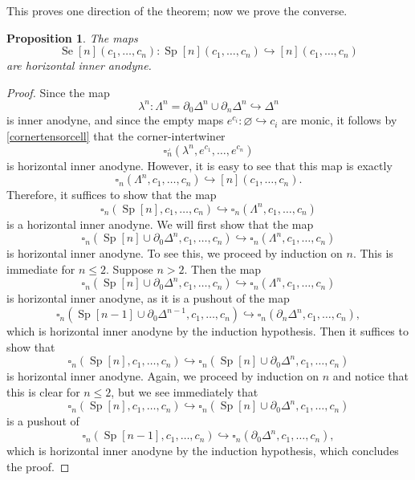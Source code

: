 \documentclass[leqno]{article}
\numberwithin{equation}{subsection}
\theoremstyle{plain}   %
\newtheorem{prop}[equation]{Proposition}
\theoremstyle{remark}
\theoremstyle{plain}
\begin{document}
This proves one direction of the theorem; now we prove the converse.
\begin{prop} The maps \[\operatorname{Se}[n](c_1,\dots,c_n):\operatorname{Sp}[n](c_1,\dots,c_n) \hookrightarrow [n](c_1,\dots,c_n)\] are horizontal inner anodyne.
\end{prop}
\begin{proof} 
	Since the map 
	\[\lambda^n: \Lambda^n=\partial_0 \Delta^n \cup \partial_n\Delta^n \hookrightarrow \Delta^n\]
	is inner anodyne, and since the empty maps \(e^{c_i}:\varnothing \hookrightarrow c_i\) are monic, it follows by \ref{cornertensorcell} that the corner-intertwiner 
	\[\square^\lrcorner_n(\lambda^n,e^{c_1},\dots,e^{c_n})\]
	is horizontal inner anodyne.  However, it is easy to see that this map is exactly \[\square_n(\Lambda^n,c_1,\dots,c_n) \hookrightarrow [n](c_1,\dots,c_n).\]  Therefore, it suffices to show that the map 
	\[\square_n(\operatorname{Sp}[n],c_1,\dots,c_n) \hookrightarrow \square_n(\Lambda^n,c_1,\dots,c_n)\] is a horizontal inner anodyne.  We will first show that the map 
	\[\square_n(\operatorname{Sp}[n]\cup \partial_0\Delta^n,c_1,\dots,c_n) \hookrightarrow \square_n(\Lambda^n,c_1,\dots,c_n)\] is horizontal inner anodyne.  
	To see this, we proceed by induction on \(n\).  This is immediate for \(n\leq 2\). Suppose \(n>2\).  Then the map 
	\[\square_n(\operatorname{Sp}[n]\cup \partial_0\Delta^n,c_1,\dots,c_n) \hookrightarrow \square_n(\Lambda^n,c_1,\dots,c_n)\] is horizontal inner anodyne, as it is a pushout of the map 
	\[\square_n(\operatorname{Sp}[n-1]\cup \partial_0\Delta^{n-1},c_1,\dots,c_n) \hookrightarrow \square_n(\partial_n \Delta^n,c_1,\dots,c_n),\]
	which is horizontal inner anodyne by the induction hypothesis.  Then it suffices to show that 
	\[\square_n(\operatorname{Sp}[n],c_1,\dots,c_n) \hookrightarrow \square_n(\operatorname{Sp}[n]\cup \partial_0\Delta^n,c_1,\dots,c_n)\] is horizontal inner anodyne.  Again, we proceed by induction on \(n\) and notice that this is clear for \(n\leq 2\), but we see immediately that \[\square_n(\operatorname{Sp}[n],c_1,\dots,c_n) \hookrightarrow \square_n(\operatorname{Sp}[n]\cup \partial_0\Delta^n,c_1,\dots,c_n)\] is a pushout of 
	\[\square_n(\operatorname{Sp}[n-1],c_1,\dots,c_n) \hookrightarrow \square_n(\partial_0 \Delta^n ,c_1,\dots,c_n),\]
	which is horizontal inner anodyne by the induction hypothesis, which concludes the proof.
\end{proof}
\end{document}
